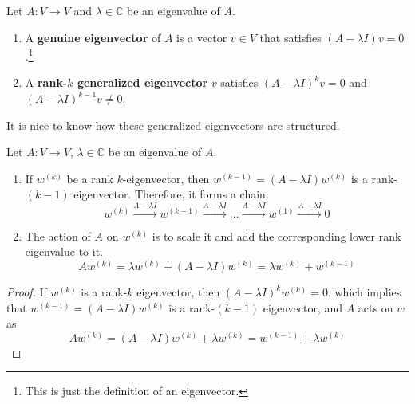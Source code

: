 	\begin{definition}
	  \label{def:generalized-genuine-eigenvector}
		Let $A: V \to V$ and $\lambda \in \mathbb{C}$ be an eigenvalue of $A$. 
		\begin{enumerate}
			\item A \textbf{genuine eigenvector} of $A$ is a vector $v \in V$ that satisfies $(A - \lambda I) v = 0$.\footnote{This is just the definition of an eigenvector.}
			\item A \textbf{rank-$k$ generalized eigenvector} $v$ satisfies $(A - \lambda I)^{k} v = 0$ and $(A - \lambda I)^{k-1} v \neq 0$. 
		\end{enumerate}
  \end{definition}

	It is nice to know how these generalized eigenvectors are structured. 

	\begin{lemma}
		\label{thm:generalized_eigenvector_chain}
		Let $A: V \to V$, $\lambda \in \mathbb{C}$ be an eigenvalue of $A$. 
		\begin{enumerate}
			\item If $w^{(k)}$ be a rank $k$-eigenvector, then $w^{(k-1)} = (A - \lambda I) w^{(k)}$ is a rank-$(k-1)$ eigenvector. Therefore, it forms a chain: 
				\begin{equation}
					w^{(k)} \xrightarrow{A - \lambda I} w^{(k-1)} \xrightarrow{A - \lambda I} \ldots \xrightarrow{A - \lambda I} w^{(1)} \xrightarrow{A - \lambda I} 0
				\end{equation}

			\item The action of $A$ on $w^{(k)}$ is to scale it and add the corresponding lower rank eigenvalue to it. 
				\begin{equation}
					A w^{(k)} = \lambda w^{(k)} + (A - \lambda I) w^{(k)} = \lambda w^{(k)} + w^{(k-1)}
				\end{equation}
		\end{enumerate}
	\end{lemma}
	\begin{proof}
		If $w^{(k)}$ is a rank-$k$ eigenvector, then $(A - \lambda I)^k w^{(k)} = 0$, which implies that $w^{(k-1)} = (A - \lambda I) w^{(k)}$ is a rank-$(k-1)$ eigenvector, and $A$ acts on $w$ as 
		\begin{equation}
			Aw^{(k)} = (A - \lambda I) w^{(k)} + \lambda w^{(k)} = w^{(k-1)} + \lambda w^{(k)}
		\end{equation}
	\end{proof}

